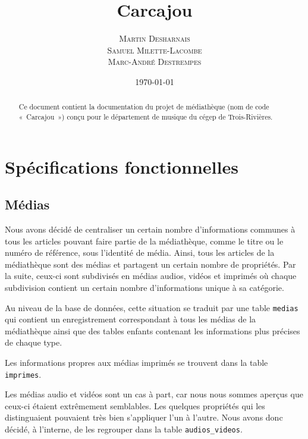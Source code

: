 \documentclass[letter, 11pt]{report}
\begin{document}
\title{Carcajou}
\author{\textsc{Martin Desharnais} \\ \textsc{Samuel Milette-Lacombe} \\ \textsc{Marc-André Destrempes}}
\date{\today}

\maketitle

\begin{abstract}
Ce document contient la documentation du projet de médiathèque (nom de code «~Carcajou~») conçu pour le département de musique du cégep de Trois-Rivières.
\end{abstract}

\newpage
\tableofcontents
\newpage

\chapter{Spécifications fonctionnelles}


\section{Médias}

Nous avons décidé de centraliser un certain nombre d'informations communes à tous les articles pouvant faire partie de la médiathèque, comme le titre ou le numéro de référence, sous l'identité de média. Ainsi, tous les articles de la médiathèque sont des médias et partagent un certain nombre de propriétés. Par la suite, ceux-ci sont subdivisés en médias audios, vidéos et imprimés où chaque subdivision contient un certain nombre d'informations unique à sa catégorie.

Au niveau de la base de données, cette situation se traduit par une table \texttt{medias} qui contient un enregistrement correspondant à tous les médias de la médiathèque ainsi que des tables enfants contenant les informations plus précises de chaque type.

Les informations propres aux médias imprimés se trouvent dans la table \texttt{imprimes}.

Les médias audio et vidéos sont un cas à part, car nous nous sommes aperçus que ceux-ci étaient extrêmement semblables. Les quelques propriétés qui les distinguaient pouvaient très bien s'appliquer l'un à l'autre. Nous avons donc décidé, à l'interne, de les regrouper dans la table \texttt{audios\_videos}.
\end{document}
